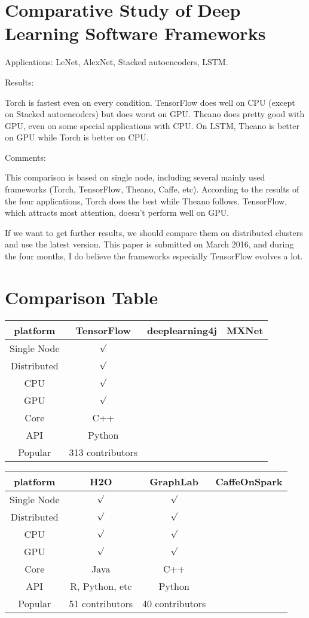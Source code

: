 \documentclass{article}
\begin{document}
\section{Comparative Study of Deep Learning Software Frameworks}
Applications: LeNet, AlexNet, Stacked autoencoders, LSTM.

Results:

Torch is fastest even on every condition. TensorFlow does well on CPU (except on Stacked autoencoders) but does worst on GPU. Theano does pretty good with GPU, even on some special applications with CPU. On LSTM, Theano is better on GPU while Torch is better on CPU.

Comments:

This comparison is based on single node, including several mainly used frameworks (Torch, TensorFlow, Theano, Caffe, etc). According to the results of the four applications, Torch does the best while Theano follows. TensorFlow, which attracts most attention, doesn't perform well on GPU.

If we want to get further results, we should compare them on distributed clusters and use the latest version. This paper is submitted on March 2016, and during the four months, I do believe the frameworks especially TensorFlow evolves a lot.
\section{Comparison Table}
\begin{tabular}{|c|c|c|c|}
\hline
platform & TensorFlow & deeplearning4j & MXNet \\
\hline
Single Node & ${\surd}$  &  &  \\
\hline
Distributed & ${\surd}$ &  &   \\
\hline
CPU & ${\surd}$ &  &  \\
\hline
GPU & ${\surd}$ &  &  \\
\hline
Core & C++ &  &  \\
\hline
API & Python &  &  \\
\hline
Popular & 313 contributors &  &  \\
\hline
\end{tabular}

\begin{tabular}{|c|c|c|c|}
\hline
platform & H2O & GraphLab & CaffeOnSpark \\
\hline
Single Node & ${\surd}$ & ${\surd}$ &  \\
\hline
Distributed & ${\surd}$ & ${\surd}$ &  \\
\hline
CPU & ${\surd}$ & ${\surd}$ &  \\
\hline
GPU & ${\surd}$ & ${\surd}$ &  \\
\hline
Core & Java & C++ &  \\
\hline
API & R, Python, etc & Python &  \\
\hline
Popular & 51 contributors & 40 contributors &  \\
\hline
\end{tabular}
\end{document}

